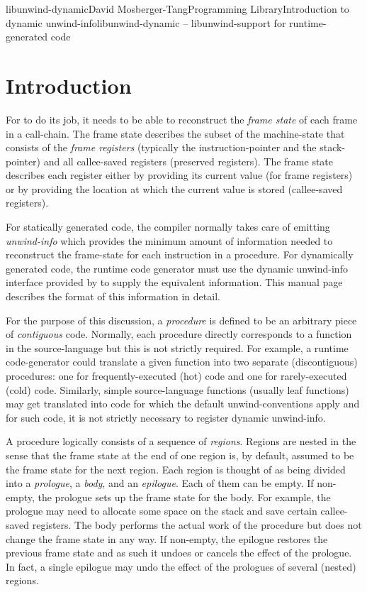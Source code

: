 \documentclass{article}
\begin{document}
\begin{Name}{3}{libunwind-dynamic}{David Mosberger-Tang}{Programming Library}{Introduction to dynamic unwind-info}libunwind-dynamic -- libunwind-support for runtime-generated code
\end{Name}

\section{Introduction}

For  to do its job, it needs to be able to reconstruct
the \emph{frame state} of each frame in a call-chain.  The frame state
describes the subset of the machine-state that consists of the
\emph{frame registers} (typically the instruction-pointer and the
stack-pointer) and all callee-saved registers (preserved registers).
The frame state describes each register either by providing its
current value (for frame registers) or by providing the location at
which the current value is stored (callee-saved registers).

For statically generated code, the compiler normally takes care of
emitting \emph{unwind-info} which provides the minimum amount of
information needed to reconstruct the frame-state for each instruction
in a procedure.  For dynamically generated code, the runtime code
generator must use the dynamic unwind-info interface provided by
 to supply the equivalent information.  This manual
page describes the format of this information in detail.

For the purpose of this discussion, a \emph{procedure} is defined to
be an arbitrary piece of \emph{contiguous} code.  Normally, each
procedure directly corresponds to a function in the source-language
but this is not strictly required.  For example, a runtime
code-generator could translate a given function into two separate
(discontiguous) procedures: one for frequently-executed (hot) code and
one for rarely-executed (cold) code.  Similarly, simple
source-language functions (usually leaf functions) may get translated
into code for which the default unwind-conventions apply and for such
code, it is not strictly necessary to register dynamic unwind-info.

A procedure logically consists of a sequence of \emph{regions}.
Regions are nested in the sense that the frame state at the end of one
region is, by default, assumed to be the frame state for the next
region.  Each region is thought of as being divided into a
\emph{prologue}, a \emph{body}, and an \emph{epilogue}.  Each of them
can be empty.  If non-empty, the prologue sets up the frame state for
the body.  For example, the prologue may need to allocate some space
on the stack and save certain callee-saved registers.  The body
performs the actual work of the procedure but does not change the
frame state in any way.  If non-empty, the epilogue restores the
previous frame state and as such it undoes or cancels the effect of
the prologue.  In fact, a single epilogue may undo the effect of the
prologues of several (nested) regions.
\end{document}
